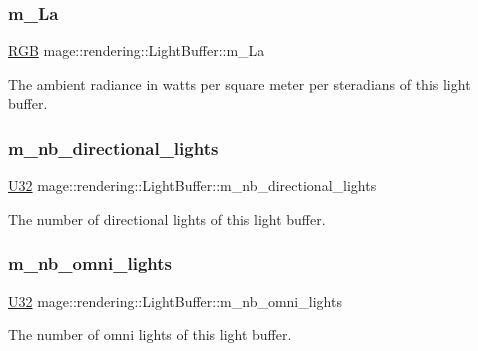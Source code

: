 \subsubsection{\texorpdfstring{m\+\_\+\+La}{m\_La}}
{\footnotesize\ttfamily \hyperlink{structmage_1_1_r_g_b}{R\+GB} mage\+::rendering\+::\+Light\+Buffer\+::m\+\_\+\+La}

The ambient radiance in watts per square meter per steradians of this light buffer. \hypertarget{structmage_1_1rendering_1_1_light_buffer_a4ebd93f25e72d8ba426599e94369547b}{}\label{structmage_1_1rendering_1_1_light_buffer_a4ebd93f25e72d8ba426599e94369547b} 
\subsubsection{\texorpdfstring{m\+\_\+nb\+\_\+directional\+\_\+lights}{m\_nb\_directional\_lights}}
{\footnotesize\ttfamily \hyperlink{namespacemage_a41c104c036fba3756a74e19f793eeaa1}{U32} mage\+::rendering\+::\+Light\+Buffer\+::m\+\_\+nb\+\_\+directional\+\_\+lights}

The number of directional lights of this light buffer. \hypertarget{structmage_1_1rendering_1_1_light_buffer_a1a5e40bcec229bad29eacde98f3abe28}{}\label{structmage_1_1rendering_1_1_light_buffer_a1a5e40bcec229bad29eacde98f3abe28} 
\subsubsection{\texorpdfstring{m\+\_\+nb\+\_\+omni\+\_\+lights}{m\_nb\_omni\_lights}}
{\footnotesize\ttfamily \hyperlink{namespacemage_a41c104c036fba3756a74e19f793eeaa1}{U32} mage\+::rendering\+::\+Light\+Buffer\+::m\+\_\+nb\+\_\+omni\+\_\+lights}

The number of omni lights of this light buffer. \hypertarget{structmage_1_1rendering_1_1_light_buffer_ad90bc8cb163fe39efcb5c960cb566f16}{}\label{structmage_1_1rendering_1_1_light_buffer_ad90bc8cb163fe39efcb5c960cb566f16} 
